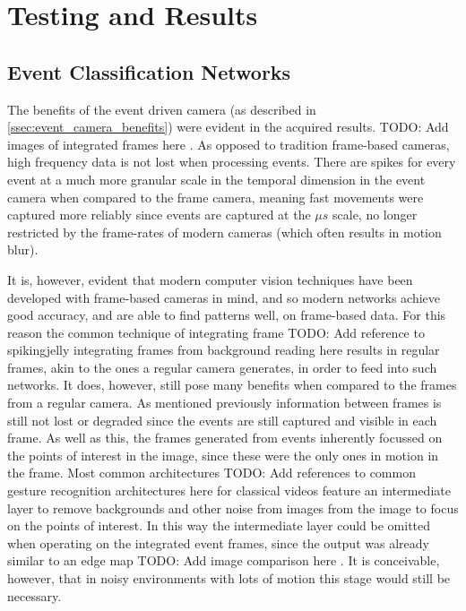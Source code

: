 \chapter{Testing and Results}

\section{Event Classification Networks}

The benefits of the event driven camera (as described in \cref{ssec:event_camera_benefits}) were evident in the acquired results. \color{red} TODO: Add images of integrated frames here \color{black}. As opposed to tradition frame-based cameras, high frequency data is not lost when processing events. There are spikes for every event at a much more granular scale in the temporal dimension in the event camera when compared to the frame camera, meaning fast movements were captured more reliably since events are captured at the $\mu s$ scale, no longer restricted by the frame-rates of modern cameras (which often results in motion blur).

It is, however, evident that modern computer vision techniques have been developed with frame-based cameras in mind, and so modern networks achieve good accuracy, and are able to find patterns well, on frame-based data. For this reason the common technique of integrating frame \color{red} TODO: Add reference to spikingjelly integrating frames from background reading here \color{black} results in regular frames, akin to the ones a regular camera generates, in order to feed into such networks. It does, however, still pose many benefits when compared to the frames from a regular camera. As mentioned previously information between frames is still not lost or degraded since the events are still captured and visible in each frame. As well as this, the frames generated from events inherently focussed on the points of interest in the image, since these were the only ones in motion in the frame. Most common architectures \color{red} TODO: Add references to common gesture recognition architectures here \color{black} for classical videos feature an intermediate layer to remove backgrounds and other noise from images from the image to focus on the points of interest. In this way the intermediate layer could be omitted when operating on the integrated event frames, since the output was already similar to an edge map \color{red} TODO: Add image comparison here \color{black}. It is conceivable, however, that in noisy environments with lots of motion this stage would still be necessary.


